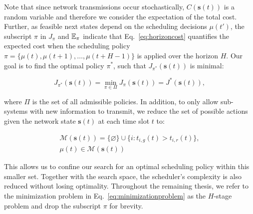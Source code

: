 Note that since network transmissions occur stochastically,
$C(\boldsymbol{s}(t))$ is a random variable and therefore we consider the
expectation of the total cost. Further, as feasible next states depend on the
scheduling decisions $\mu(t')$, the subscript $\pi$ in $J_\pi$ and $\mathbb{E}_\pi$
indicate that Eq.~\eqref{eq:horizoncost} quantifies the expected cost when the
scheduling policy $\pi = \{ \mu(t), {\mu(t+1)}, \dots, \mu(t+H-1) \}$ is applied
over the horizon $H$. Our goal is to find the optimal policy $\pi^*$, such that
$J_{\pi^*}(\boldsymbol{s}(t))$ is minimal:

\begin{equation}
\label{eq:minimizationproblem}
	J_{\pi^*}(\boldsymbol{s}(t)) = \min_{\pi \in \Pi} J_\pi (\boldsymbol{s}(t)) = J^*(\boldsymbol{s}(t)),
\end{equation}

where $\Pi$ is the set of all admissible policies. In addition, to only allow
sub-systems with new information to transmit, we reduce the set of possible
actions given the network state $\boldsymbol{s}(t)$ at each time slot $t$ to:

\begin{gather}
  \label{eq:admissibleactions}
  \mathcal{M}(\boldsymbol{s}(t)) = \{\varnothing\} \cup \{i : t_{i,g}(t) > t_{i,r}(t) \}, \\
  \mu(t) \in \mathcal{M}(\boldsymbol{s}(t))
\end{gather}

This allows us to confine our search for an optimal scheduling policy within
this smaller set. Together with the search space, the scheduler's complexity is
also reduced without losing optimality. Throughout the remaining thesis, we
refer to the minimization problem in Eq.~\eqref{eq:minimizationproblem} as the
$H$-stage problem and drop the subscript $\pi$ for brevity.
